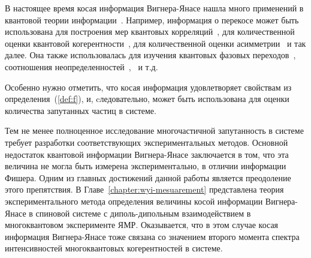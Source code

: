 В настоящее время косая информация Вигнера-Янасе нашла много применений в квантовой теории информации~\cite{Wigner1963, Luo2017}.
Например, информация о перекосе может быть использована для построения мер квантовых корреляций~\cite{Luo2005, Luo2012, Li2016a, Sun2017},
для количественной оценки квантовой когерентности~\cite{Girolami2014, Yu2017, Luo2017, Luo2018},
для количественной оценки асимметрии~\cite{Luo2018} и так далее.
Она также использовалась для изучения квантовых фазовых переходов~\cite{Karpat2014, Malvezzi2016, Li2016b, Lei2016, Qiu2017}, соотношения неопределенностей~\cite{Luo2005},~\cite{Yanagi2005, Furuichi2010, Chen2016} и т.д.

Особенно нужно отметить,
что косая информация удовлетворяет свойствам из определения~(\ref{def:f}),
и, cледовательно, может быть использована для оценки количества запутанных частиц в системе.



Тем не менее полноценное исследование многочастичной запутанность в системе
требует разработки соответствующих экспериментальных методов.
Основной недостаток квантовой информации Вигнера-Янасе заключается в том,
что эта величина не могла быть измерена экспериментально,
в отличии информации Фишера\cite{Garttner2018}.
Одним из главных достижений данной работы является преодоление этого препятствия.
В Главе~\ref{chapter:wyi-mesuarement} представлена теория экспериментального метода определения величины косой информации Вигнера-Янасе
в спиновой системе с диполь-дипольным взаимодействием в многоквантовом эксперименте ЯМР.
Оказывается,
что в этом случае косая информация Вигнера-Янасе тоже связана со значением
второго момента спектра интенсивностей многоквантовых когерентностей в системе.

